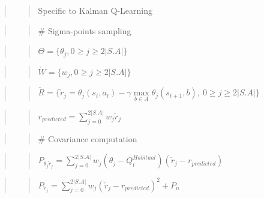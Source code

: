 \documentclass[10pt,a4paper,onecolumn]{article}
\begin{document}
\begin{quote}
\begin{quote}
Specific to Kalman Q-Learning
\end{quote}
\end{quote}

\begin{quote}
\begin{quote}
\(\#\) Sigma-points sampling
\end{quote}
\end{quote}

\begin{quote}
\begin{quote}
\(\Theta = \{ \theta_j, 0 \geq j \geq 2|S.A|\}\)
\end{quote}
\end{quote}

\begin{quote}
\begin{quote}
\(\check{W} = \{ w_j, 0 \geq j \geq 2|S.A| \}\)
\end{quote}
\end{quote}

\begin{quote}
\begin{quote}
\(\check{R} = \{ \check{r}_j = \theta_j(s_t,a_t) - \gamma \max\limits_{b \in A} \theta_j(s_{t+1},b),\ 0 \geq j \geq 2|S.A|\}\)
\end{quote}
\end{quote}

\begin{quote}
\begin{quote}
\(r_{predicted} = \sum\limits_{j=0}^{2|S.A|} w_j \check{r}_j\)
\end{quote}
\end{quote}

\begin{quote}
\begin{quote}
\(\#\) Covariance computation
\end{quote}
\end{quote}

\begin{quote}
\begin{quote}
\(P_{\theta_j \check{r}_j} = \sum\limits_{j=0}^{2|S.A|} w_j (\theta_j - Q^{Habitual}_t)(\check{r}_j - r_{predicted})\)
\end{quote}
\end{quote}

\begin{quote}
\begin{quote}
\(P_{\check{r}_j} = \sum\limits_{j=0}^{2|S.A|} w_j (\check{r}_j - r_{predicted})^2 + P_n\)
\end{quote}
\end{quote}
\end{document}
